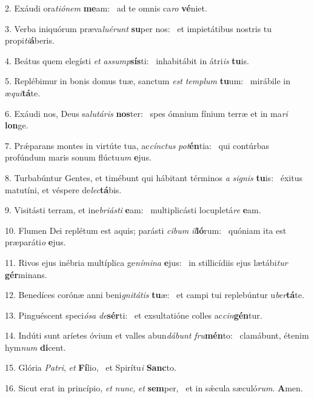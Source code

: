 2. Exáudi ora\textit{ti}\textit{ó}\textit{nem} \textbf{me}am: \ast\  ad te omnis ca\textit{ro} \textbf{vé}niet.\

3. Verba iniquórum præva\textit{lu}\textit{é}\textit{runt} \textbf{su}per nos: \ast\  et impietátibus nostris tu propi\textit{ti}\textbf{á}beris.\

4. Beátus quem elegísti \textit{et} \textit{as}\textit{sump}\textbf{sís}ti: \ast\  inhabitábit in átri\textit{is} \textbf{tu}is.\

5. Replébimur in bonis domus tuæ, sanctum \textit{est} \textit{tem}\textit{plum} \textbf{tu}um: \ast\  mirábile in æ\textit{qui}\textbf{tá}te.\

6. Exáudi nos, Deus sa\textit{lu}\textit{tá}\textit{ris} \textbf{nos}ter: \ast\  spes ómnium fínium terræ et in ma\textit{ri} \textbf{lon}ge.\

7. Prǽparans montes in virtúte tua, ac\textit{cínc}\textit{tus} \textit{pot}\textbf{én}tia: \ast\  qui contúrbas profúndum maris sonum flúctu\textit{um} \textbf{e}jus.\

8. Turbabúntur Gentes, et timébunt qui hábitant términos \textit{a} \textit{si}\textit{gnis} \textbf{tu}is: \ast\  éxitus matutíni, et véspere de\textit{lec}\textbf{tá}bis.\

9. Visitásti terram, et ine\textit{bri}\textit{ás}\textit{ti} \textbf{e}am: \ast\  multiplicásti locupletá\textit{re} \textbf{e}am.\

10. Flumen Dei replétum est aquis; parásti \textit{ci}\textit{bum} \textit{il}\textbf{ló}rum: \ast\  quóniam ita est præparáti\textit{o} \textbf{e}jus.\

11. Rivos ejus inébria multíplica ge\textit{ní}\textit{mi}\textit{na} \textbf{e}jus: \ast\  in stillicídiis ejus lætábi\textit{tur} \textbf{gér}minans.\

12. Benedíces corónæ anni beni\textit{gni}\textit{tá}\textit{tis} \textbf{tu}æ: \ast\  et campi tui replebúntur u\textit{ber}\textbf{tá}te.\

13. Pinguéscent speci\textit{ó}\textit{sa} \textit{de}\textbf{sér}ti: \ast\  et exsultatióne colles ac\textit{cin}\textbf{gén}tur.\

14. Indúti sunt aríetes óvium et valles abun\textit{dá}\textit{bunt} \textit{fru}\textbf{mén}to: \ast\  clamábunt, étenim hym\textit{num} \textbf{di}cent.\

15. Glória \textit{Pa}\textit{tri}, \textit{et} \textbf{Fí}lio, \ast\  et Spirítu\textit{i} \textbf{Sanc}to.\

16. Sicut erat in princípio, \textit{et} \textit{nunc}, \textit{et} \textbf{sem}per, \ast\  et in sǽcula sæculó\textit{rum}. \textbf{A}men.\

